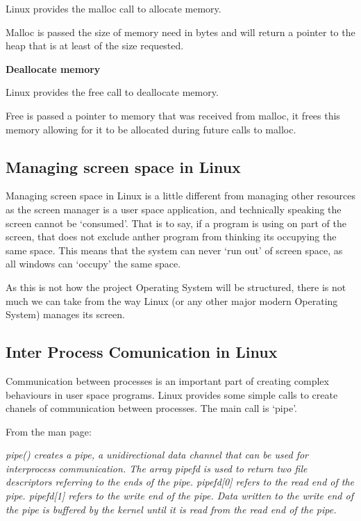 \documentclass[a4paper]{report}
\begin{document}
Linux provides the malloc call to allocate memory.

Malloc is passed the size of memory need in bytes and will return a pointer to the heap that is at least of the size requested.

\noindent
\textbf{Deallocate memory}

Linux provides the free call to deallocate memory.

Free is passed a pointer to memory that was received from malloc, it frees this memory allowing for it to be allocated during future calls to malloc.


\subsection{Managing screen space in Linux}

Managing screen space in Linux is a little different from managing other resources as the screen manager is a user space application, and technically speaking the screen cannot be `consumed'. That is to say, if a program is using on part of the screen, that does not exclude anther program from thinking its occupying the same space. This means that the system can never `run out' of screen space, as all windows can `occupy' the same space.

As this is not how the project Operating System will be structured, there is not much we can take from the way Linux (or any other major modern Operating System) manages its screen.


\subsection{Inter Process Comunication in Linux}

Communication between processes is an important part of creating complex behaviours in user space programs. Linux provides some simple calls to create chanels of communication between processes. The main call is `pipe'.

From the man page:

\textit{pipe() creates a pipe, a unidirectional data channel that can be used for interprocess communication. The array pipefd is used to return two file descriptors referring to the ends of the pipe. pipefd[0] refers to the read end of the pipe. pipefd[1] refers to the write end of the pipe. Data written to the write end of the pipe is buffered by the kernel until it is read from the read end of the pipe.} \cite{manPipe}
\end{document}
